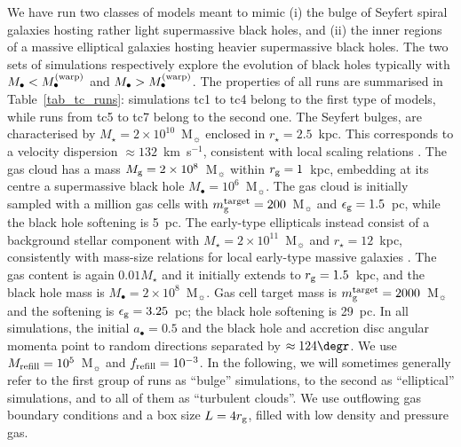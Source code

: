 \documentclass[a4paper,fleqn,usenatbib]{mnras}
\begin{document}
We have run two classes of models meant to mimic (i) the bulge of Seyfert spiral galaxies hosting rather light supermassive black holes, and (ii) the inner regions of a massive elliptical galaxies hosting heavier supermassive black holes.
The two sets of simulations respectively explore the evolution of black holes typically with $M_{\bullet} < M_{\bullet}^{\rm (warp)}$ and $M_{\bullet} > M_{\bullet}^{\rm (warp)}$.
The properties of all runs are summarised in Table~\ref{tab_tc_runs}: simulations tc1 to tc4 belong to the first type of models, while runs from tc5 to tc7 belong to the second one.
The Seyfert bulges, are characterised by $M_{\star} = 2 \times 10^{10}$~M$_{\sun}$ enclosed in $r_{\star} = 2.5$~kpc.
This corresponds to a velocity dispersion $\approx 132$~km~s$^{-1}$, consistent with local scaling relations \citep{catinella+12}.
The gas cloud has a mass $M_{\rm g} = 2 \times 10^8$~M$_{\sun}$ within $r_{\rm g} = 1$~kpc, embedding at its centre a supermassive black hole $M_{\bullet} = 10^6$~M$_{\sun}$.
The gas cloud is initially sampled with a million gas cells with $m_{\rm g}^{\rm target} = 200$~M$_{\sun}$ and $\epsilon_{\rm g} = 1.5$~pc, while the black hole softening is 5~pc.
The early-type ellipticals instead consist of a background stellar component with $M_{\star} = 2 \times 10^{11}$~M$_{\sun}$ and $r_{\star} = 12$~kpc, consistently with mass-size relations for local early-type massive galaxies \citep{vanderwel+14}.
The gas content is again $0.01 M_{\star}$ and it initially extends to $r_{\rm g} = 1.5$~kpc, and the black hole mass is $M_{\bullet} = 2 \times 10^8$~M$_{\sun}$. 
Gas cell target mass is $m_{\rm g}^{\rm target} = 2000$~M$_{\sun}$ and the softening is $\epsilon_{\rm g} = 3.25$~pc; the black hole softening is 29~pc. 
In all simulations, the initial $a_{\bullet} = 0.5$ and the black hole and accretion disc angular momenta point to random directions separated by $\approx 124\degr$. We use $M_{\rm refill} = 10^5$~M$_{\sun}$ and $f_{\rm refill} = 10^{-3}$.
In the following, we will sometimes generally refer to the first group of runs as ``bulge'' simulations, to the second as ``elliptical'' simulations, and to all of them as ``turbulent clouds''.
We use outflowing gas boundary conditions and a box size $L=4 r_{\rm g}$, filled with low density and pressure gas.
\end{document}
